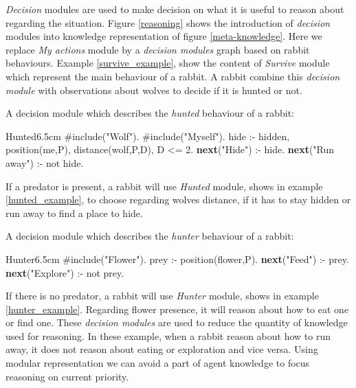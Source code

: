 \documentclass{aamas2012}
\begin{document}
	\emph{Decision} modules are used to make decision on what it is useful to reason about regarding the situation.
	Figure \ref{reasoning} shows the introduction of \emph{decision} modules into knowledge representation of figure \ref{meta-knowledge}.
	Here we replace \emph{My actions} module by a \emph{decision modules} graph based on rabbit behaviours.
	Example \ref{survive_example}, show the content of \emph{Survive} module which represent the main behaviour of a rabbit.
	A rabbit combine this \emph{decision module} with observations about wolves to decide if it is hunted or not.
	
	\begin{example}
		\label{hunted_example}
		A decision module which describes the \emph{hunted} behaviour of a rabbit:\newline
		\begin{module}{Hunted}{6.5cm}
			\#include("Wolf").\newline
			\#include("Myself").\newline
			\newline
			hide :- hidden, position(me,P), distance(wolf,P,D), D <= 2.\newline
			\textbf{next}("Hide") :- hide.\newline
			\textbf{next}("Run away") :- not hide.
		\end{module}
	\end{example}
	
	If a predator is present, a rabbit will use \emph{Hunted} module, shows in example \ref{hunted_example},
	to choose regarding wolves distance, if it has to stay hidden or run away to find a place to hide.
	
	\begin{example}
		\label{hunter_example}
		A decision module which describes the \emph{hunter} behaviour of a rabbit:\newline
		\begin{module}{Hunter}{6.5cm}
			\#include("Flower").\newline
			\newline
			prey :- position(flower,P).\newline
			\textbf{next}("Feed") :- prey.\newline
			\textbf{next}("Explore") :- not prey.
		\end{module}
	\end{example}
	
	If there is no predator, a rabbit will use \emph{Hunter} module, shows in example \ref{hunter_example}.
	Regarding flower presence, it will reason about how to eat one or find one.
	These \emph{decision modules} are used to reduce the quantity of knowledge used for reasoning.
	In these example, when a rabbit reason about how to run away, it does not reason about eating or exploration and vice versa.
	Using modular representation we can avoid a part of agent knowledge to focus reasoning on current priority.
	
\end{document}
